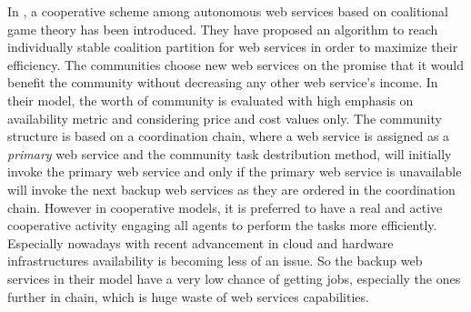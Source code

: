         In \cite{10.1109/TSC.2012.12}, a cooperative scheme among autonomous
        web services based on coalitional game theory has been introduced. They have proposed an algorithm to
        reach individually stable coalition partition for web services in order to
        maximize their efficiency. The communities choose new web services on the promise
        that it would benefit the community without decreasing any other web service's
        income. In their model, the worth of community is evaluated with high emphasis on
        availability metric and considering price and cost values only. The community structure is based on a coordination chain,
        where a web service is assigned as a \emph{primary} web service and the community task destribution
        method, will initially invoke the primary web service and only if the primary web service is unavailable
        will invoke the next backup web services as they are ordered in the coordination chain. However in cooperative models, it is preferred to
        have a real and active cooperative activity engaging all agents to perform the tasks more efficiently. Especially nowadays
        with recent advancement in cloud and hardware infrastructures availability is becoming less of an issue. So the backup web services
        in their model have a very low chance of getting jobs, especially the ones further in chain, which is huge waste of web services
        capabilities.


